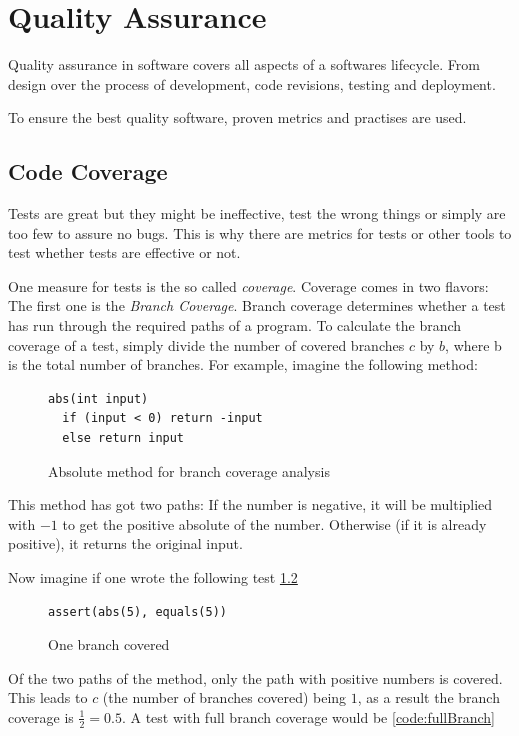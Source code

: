 \chapter{Quality Assurance}

Quality assurance in software covers all aspects of a softwares lifecycle.
From design over the process of development, code revisions, testing and
deployment.

To ensure the best quality software, proven metrics and practises are used.

\section{Code Coverage}

Tests are great but they might be ineffective, test the wrong things
or simply are too few to assure no bugs. This is why there are metrics
for tests or other tools to test whether tests are effective or not.

One measure for tests is the so called \textit{coverage}. Coverage
comes in two flavors: The first one is the \textit{Branch Coverage}.
Branch coverage determines whether a test has run through the
required paths of a program. To calculate the branch coverage of a test,
simply divide the number of covered branches $c$ by $b$, where b is the
total number of branches. For example, imagine the following
method:

\begin{figure}
\begin{lstlisting}
abs(int input)
  if (input < 0) return -input
  else return input
\end{lstlisting}
\caption{Absolute method for branch coverage analysis}
\label{code:branchCoverage}
\end{figure}

This method has got two paths: If the number is negative, it will
be multiplied with $-1$ to get the positive absolute of the number.
Otherwise (if it is already positive), it returns the original input.

Now imagine if one wrote the following test \ref{code:oneBranch}

\begin{figure}
\begin{lstlisting}
assert(abs(5), equals(5))
\end{lstlisting}
\caption{One branch covered}
\label{code:oneBranch}
\end{figure}

Of the two paths of the method, only the path with positive numbers is
covered. This leads to $c$ (the number of branches covered) being $1$,
as a result the branch coverage is $\frac{1}{2} = 0.5$. A test with
full branch coverage would be \ref{code:fullBranch}

